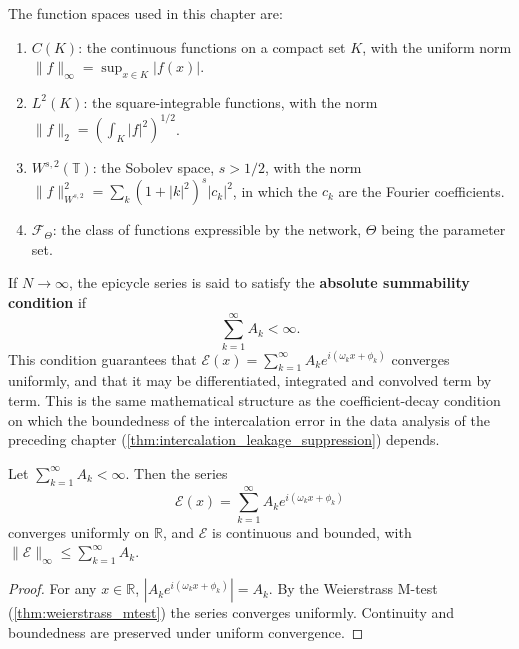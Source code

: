 \begin{definition}\label{def:function-classes}
The function spaces used in this chapter are:
\begin{enumerate}[label=(\roman*)]
    \item $C(K)$: the continuous functions on a compact set $K$, with the uniform norm $\|f\|_\infty=\sup_{x\in K}|f(x)|$.
    \item $L^2(K)$: the square-integrable functions, with the norm $\|f\|_2=\left(\int_K|f|^2\right)^{1/2}$.
    \item $W^{s,2}(\mathbb T)$: the Sobolev space, $s>1/2$, with the norm $\|f\|_{W^{s,2}}^2=\sum_{k}(1+|k|^2)^s|c_k|^2$, in which the $c_k$ are the Fourier coefficients.
    \item $\mathcal F_\Theta$: the class of functions expressible by the network, $\Theta$ being the parameter set.
\end{enumerate}
\end{definition}

\begin{definition}\label{def:absolute-summability}
If $N\to\infty$, the epicycle series is said to satisfy the \textbf{absolute summability condition} if
\[
\sum_{k=1}^{\infty}A_k<\infty.
\]
This condition guarantees that $\mathcal E(x)=\sum_{k=1}^{\infty}A_k e^{i(\omega_k x+\phi_k)}$ converges uniformly, and that it may be differentiated, integrated and convolved term by term. This is the same mathematical structure as the coefficient-decay condition on which the boundedness of the intercalation error in the data analysis of the preceding chapter (\cref{thm:intercalation_leakage_suppression}) depends.
\end{definition}

\begin{lemma}\label{lem:absolute-summability-convergence}
Let $\sum_{k=1}^{\infty}A_k<\infty$. Then the series
\[
\mathcal E(x)=\sum_{k=1}^{\infty}A_k e^{i(\omega_k x+\phi_k)}
\]
converges uniformly on $\mathbb R$, and $\mathcal E$ is continuous and bounded, with $\|\mathcal E\|_\infty\le\sum_{k=1}^{\infty}A_k$.
\end{lemma}

\begin{proof}
For any $x\in\mathbb R$, $|A_k e^{i(\omega_k x+\phi_k)}|=A_k$. By the Weierstrass M-test (\cref{thm:weierstrass_mtest}) the series converges uniformly. Continuity and boundedness are preserved under uniform convergence.
\end{proof}

